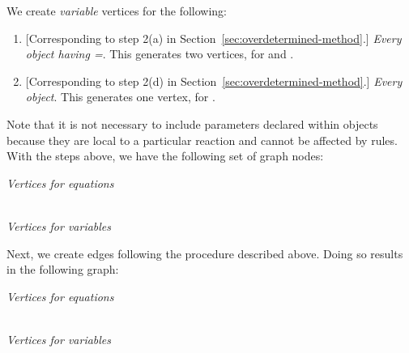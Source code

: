 \clearpage
We create \emph{variable} vertices for the following:
\begin{enumerate}
  
\item{} [Corresponding to step 2(a)
  in Section~\ref{sec:overdetermined-method}.] \emph{Every \Species
    object having =}.  This generates
  two vertices, for  and .
  
\item{} [Corresponding to step 2(d)
  in Section~\ref{sec:overdetermined-method}.] \emph{Every \Reaction
    object}.  This generates one vertex, for .

\end{enumerate}

Note that it is not necessary to include parameters declared
within \KineticLaw objects because they are local to a particular
reaction and cannot be affected by rules.  With the steps above,
we have the following set of graph nodes:
\begin{center}
\emph{Vertices for equations}\\[10pt]
  \\[5pt]
\emph{Vertices for variables}
\end{center}

Next, we create edges following the procedure described above.
Doing so results in the following graph:
\begin{center}
\emph{Vertices for equations}\\[10pt]
  \\[5pt]
\emph{Vertices for variables}
\end{center}

